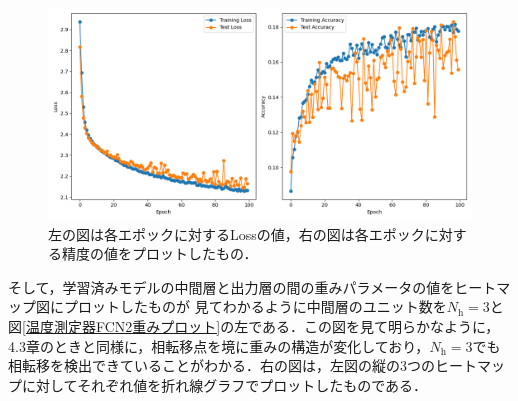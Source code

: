 \documentclass[a4paper,11pt]{jsreport}
\begin{document}
\begin{figure}[H]
  \begin{center}
      \includegraphics[width=\linewidth]{image/温度測定器2_L16_FCN_Nh3_loss.png}
      \caption{左の図は各エポックに対するLossの値，右の図は各エポックに対する精度の値をプロットしたもの．}
      \label{温度測定器FCN2lossと精度}
  \end{center}
\end{figure}

そして，学習済みモデルの中間層と出力層の間の重みパラメータの値をヒートマップ図にプロットしたものが
見てわかるように中間層のユニット数を$N_{\text{h}}=3$と図\ref{温度測定器FCN2重みプロット}の左である．この図を見て明らかなように，4.3章のときと同様に，相転移点を境に重みの構造が変化しており，$N_{\text{h}}=3$でも相転移を検出できていることがわかる．右の図は，左図の縦の3つのヒートマップに対してそれぞれ値を折れ線グラフでプロットしたものである．\par
\end{document}
